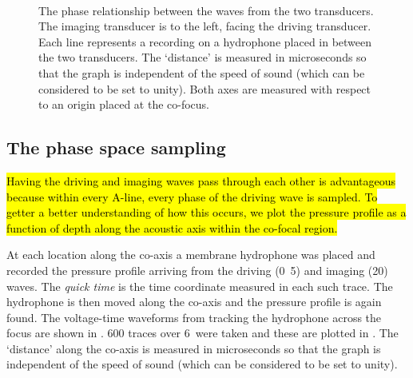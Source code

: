 \begin{centering}
\begin{figure}[p]%
  \\
  \caption{     %
    The phase relationship between the waves from the two transducers.
    The imaging transducer is to the left, facing the driving transducer.
    Each line  represents a recording on a hydrophone placed in between the two transducers.
    The `distance' is measured in microseconds so that the graph is independent of the speed of sound (which can be considered to be set to unity).
    Both axes are measured with respect to an origin placed at the co-focus.}
  \label{fig:phases}
\end{figure}
\end{centering}

\subsection{The phase space sampling}
\hl{
Having the driving and imaging waves pass through each other is advantageous because 
within every A-line, every phase of the driving wave is sampled.
To getter a better understanding of how this occurs, we plot the pressure profile as a function of depth along the acoustic axis within the co-focal region.
}

At each location along the co-axis a membrane hydrophone was placed and recorded the pressure profile arriving from the driving (\unit{0.5}\mega\hertz) and imaging (\unit{20}\mega\hertz) waves.
The \emph{quick time} is the time coordinate measured in each such trace.
The hydrophone is then moved along the co-axis and the pressure profile is again found.
%
The voltage-time waveforms from tracking the hydrophone across the focus are shown in .
600 traces over \unit{6}\milli\metre\ were taken and these are plotted in .  
The `distance' along the co-axis is measured in microseconds so that the graph is independent of the speed of sound (which can be considered to be set to unity).


